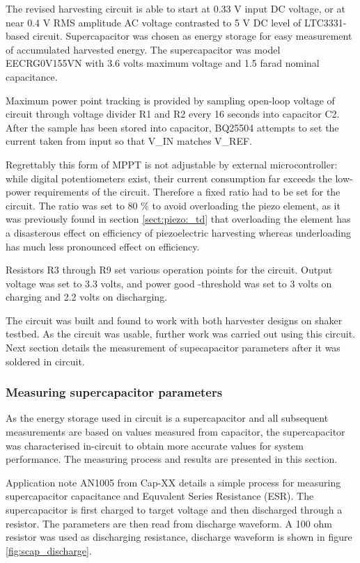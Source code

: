 The revised harvesting circuit is able to start at 0.33 V input DC voltage, or at near 0.4 V RMS amplitude AC voltage contrasted to 5 V DC level of LTC3331-based circuit. Supercapacitor was chosen as energy storage for easy measurement of accumulated harvested energy. The supercapacitor was model EECRG0V155VN \cite{panasonic_scap} with 3.6 volts maximum voltage and 1.5 farad nominal capacitance. 

Maximum power point tracking is provided by sampling open-loop voltage of circuit through voltage divider R1 and R2 every 16 seconds into capacitor C2. After the sample has been stored into capacitor, BQ25504 attempts to set the current taken from input so that V\_IN matches V\_REF. 

Regrettably this form of MPPT is not adjustable by external microcontroller: while digital potentiometers exist, their current consumption far exceeds the low-power requirements of the circuit. Therefore a fixed ratio had to be set for the circuit. The ratio was set to 80 \% to avoid overloading the piezo element, as it was previously found in section \ref{sect:piezo:_td} that overloading the element has a disasterous effect on efficiency of piezoelectric harvesting whereas underloading has much less pronounced effect on efficiency.

Resistors R3 through R9 set various operation points for the circuit. Output voltage was set to 3.3 volts, and power good -threshold was set to 3 volts on charging and 2.2 volts on discharging. 

The circuit was built and found to work with both harvester designs on shaker testbed. As the circuit was usable, further work was carried out using this circuit. Next section details the measurement of supecapacitor parameters after it was soldered in circuit.

\subsubsection{Measuring supercapacitor parameters}
As the energy storage used in circuit is a supercapacitor and all subsequent measurements are based on values measured from capacitor, the supercapacitor was characterised in-circuit to obtain more accurate values for system performance. The measuring process and results are presented in this section.

Application note AN1005 from Cap-XX \cite{capxxan1005} details a simple process for measuring supercapacitor capacitance and Equvalent Series Resistance (ESR). The supercapacitor is first charged to target voltage and then discharged through a resistor. The parameters are then read from discharge waveform. A 100 ohm resistor was used as discharging resistance, discharge waveform is shown in figure \ref{fig:scap_discharge}. 

